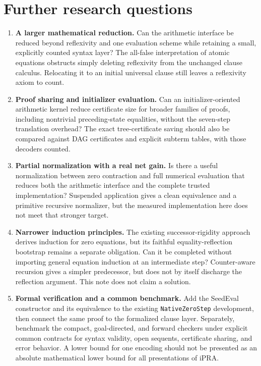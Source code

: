 \documentclass[11pt,letterpaper]{article}
\newcommand{\file}[1]{\nolinkurl{#1}}
\begin{document}
\section{Further research questions}

\begin{enumerate}
\item \textbf{A larger mathematical reduction.}
Can the arithmetic interface be reduced beyond reflexivity and one
evaluation scheme while retaining a small, explicitly counted syntax
layer? The all-false interpretation of atomic equations obstructs simply
deleting reflexivity from the unchanged clause calculus. Relocating it to
an initial universal clause still leaves a reflexivity axiom to count.

\item \textbf{Proof sharing and initializer evaluation.}
Can an initializer-oriented arithmetic kernel reduce certificate size for
broader families of proofs, including nontrivial preceding-state equalities,
without the seven-step translation overhead? The exact tree-certificate
saving should also be compared against DAG certificates and explicit
subterm tables, with those decoders counted.

\item \textbf{Partial normalization with a real net gain.}
Is there a useful normalization between zero contraction and full numerical
evaluation that reduces both the arithmetic interface and the complete
trusted implementation? Suspended application gives a clean equivalence
and a primitive recursive normalizer, but the measured implementation here
does not meet that stronger target.

\item \textbf{Narrower induction principles.}
The existing successor-rigidity approach derives induction for zero
equations, but its faithful equality-reflection bootstrap remains a
separate obligation. Can it be completed without importing general
equation induction at an intermediate step? Counter-aware recursion gives
a simpler predecessor, but does not by itself discharge the reflection
argument. This note does not claim a solution.

\item \textbf{Formal verification and a common benchmark.}
Add the SeedEval constructor and its equivalence to the existing
\file{NativeZeroStep} development, then connect the same proof to the
formalized clause layer. Separately, benchmark the compact, goal-directed,
and forward checkers under explicit common contracts for syntax validity,
open sequents, certificate sharing, and error behavior. A lower bound for
one encoding should not be presented as an absolute mathematical lower
bound for all presentations of iPRA.
\end{enumerate}
\end{document}
